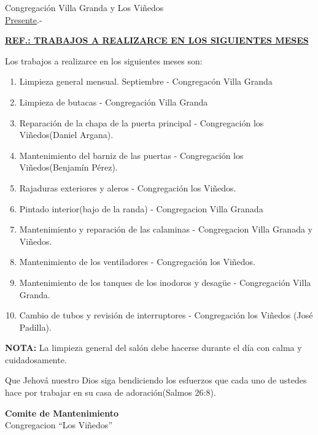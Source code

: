\documentclass[letterpaper,12pt]{letter}
\begin{document}
\begin{letter}{Congregaci\'on Villa Granda y Los Vi\~nedos \\ \underline{Presente}.-}
\begin{center}
\opening{\underline{{\bfseries REF.: TRABAJOS A REALIZARCE EN LOS SIGUIENTES MESES}}} 
\end{center}

Los trabajos a realizarce en los siguientes meses son:

\begin{enumerate}
    \item Limpieza general mensual.
    Septiembre - Congregac\'on Villa Granda
    \item Limpieza de butacas - Congregaci\'on Villa Granda
    \item Reparaci\'on de la chapa de la puerta principal - Congregaci\'on los Vi\~nedos(Daniel Argana).
    \item Mantenimiento del barniz de las puertas - Congregaci\'on los Vi\~nedos(Benjam\'in P\'erez).
    \item Rajaduras exteriores y aleros - Congregaci\'on los Vi\~nedos.
    \item Pintado interior(bajo de la randa) - Congregacion Villa Granada
    \item Mantenimiento y reparaci\'on de las calaminas - Congregacion Villa Granada y Vi\~nedos.
    \item Mantenimiento de los ventiladores - Congregaci\'on los Vi\~nedos.
    \item Mantenimiento de los tanques de los inodoros y desagüe - Congregaci\'on Villa Granda.
    \item Cambio de tubos y revisi\'on de interruptores - Congregaci\'on los Vi\~nedos (Jos\'e Padilla).
\end{enumerate}

{\bfseries NOTA:} La limpieza general del sal\'on debe hacerse durante el d\'ia con calma y cuidadosamente.

Que Jehová nuestro Dios siga bendiciendo los esfuerzos que cada uno de ustedes hace por trabajar en su casa de 
adoración(Salmos 26:8).

\vspace{4.5cm}


\signature{\\$$TITLE$$}
{\bfseries Comite de Mantenimiento}\\
Congregacion ``Los Vi\~nedos''





\end{letter}
\end{document}

